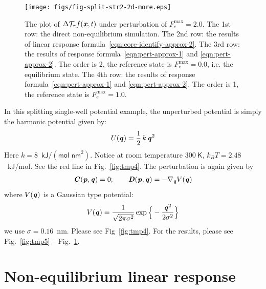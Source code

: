 \documentclass[aip,jcp,a4paper,reprint,onecolumn]{revtex4-1}
\newcommand{\vect}[1]{\textbf{\textit{#1}}}
\newcommand{\mt}{\mathcal T}
\begin{document}
\begin{figure}
  \centering
  \texttt{[image: figs/fig-split-str2-2d-more.eps]}
  \caption{The plot of $\Delta\mt_\tau f(\vect x,t)$  under perturbation of
    $F_e^{\textrm{max}} = 2.0$.
    The 1st row: the direct non-equilibrium
    simulation. The 2nd row: the results of linear response
    formula~\eqref{eqn:core-identify-approx-2}.
    The 3rd row: the results of response
    formula~\eqref{eqn:pert-approx-1} and \eqref{eqn:pert-approx-2}.
    The order is 2, the reference state is $F_e^{\textrm{max}} = 0.0$, i.e.
    the equilibrium state.
    The 4th row: the results of response
    formula~\eqref{eqn:pert-approx-1} and \eqref{eqn:pert-approx-2}.
    The order is 1, the reference state is $F_e^{\textrm{max}} = 1.0$.
  }
  \label{fig:tmp6}
\end{figure}


In this splitting single-well potential example, the unperturbed
potential is simply the harmonic potential given by:
\begin{align}
  U(\vect q) = \frac12\,k\,\vect q^2 
\end{align}
Here $k = 8$~$\textsf{kJ} / (\textsf{mol nm}^2)$.
Notice at room temperature $300\ \textsf{K}$, $k_BT = 2.48$~\textsf{kJ/mol}.
See the red line in Fig.~\ref{fig:tmp4}.
The perturbation is again given by
\begin{align}
  \vect C(\vect p, \vect q) = 0; \qquad
  \vect D(\vect p, \vect q) = -\nabla_{\vect q} V(\vect q) 
\end{align}
where $V(\vect q)$ is a Gaussian type potential:
\begin{align}
  V(\vect q) = \frac{1}{\sqrt{2\pi \sigma^2}}
  \exp\Big\{-\frac{\vect q^2}{2\sigma^2}\Big\}
\end{align}
we use $\sigma = 0.16$~\textsf{nm}. Please see Fig~\ref{fig:tmp4}.
For the results, please see Fig.~\ref{fig:tmp5} -- Fig.~\ref{fig:tmp6}.



\section{Non-equilibrium linear response}
\end{document}
